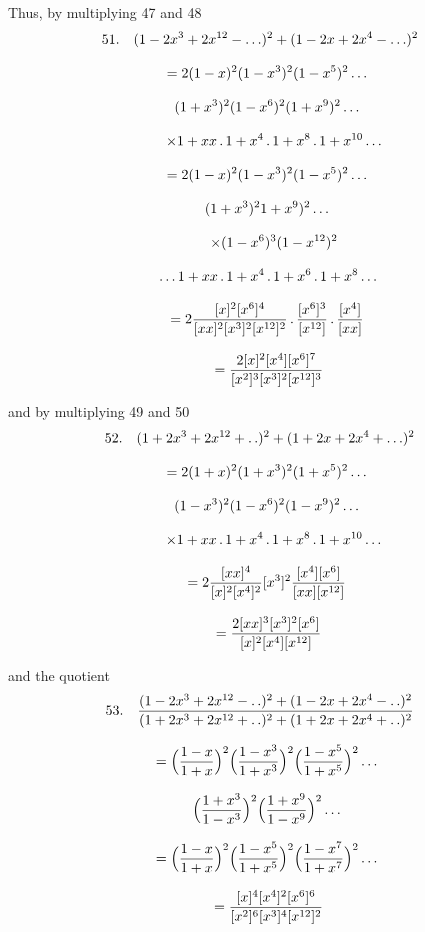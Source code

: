 Thus, by multiplying 47 and 48
\[
\begin{gathered}
51.\quad{}
(1-2x^3+2x^{12}-\mathinner{.\,.\,.})^2+(1-2x+2x^4-\mathinner{.\,.\,.})^2\\[8pt]
\quad=2(1-x)^2(1-x^3)^2(1-x^5)^2\mathinner{.\,.\,.}\\[8pt]\quad{}(1+x^3)^2(1-x^6)^2(1+x^9)^2\mathinner{.\,.\,.}\\[8pt]
\qquad\times1+xx\,.\,1+x^4\,.\,1+x^8\,.\,1+x^{10}\mathinner{.\,.\,.}\\[8pt]
\quad=2(1-x)^2(1-x^3)^2(1-x^5)^2\mathinner{.\,.\,.}\\[8pt]\quad{}(1+x^3)^2 1+x^9)^2\mathinner{.\,.\,.}\\[8pt]
\qquad\times(1-x^6)^3(1-x^{12})^2\\[8pt]\quad{}\mathinner{.\,.\,.} 1+xx\,.\,1+x^4\,.\,1+x^6\,.\,1+x^8\mathinner{.\,.\,.}\\[8pt]
\quad=2\frac{[x]^2[x^6]^4}{[xx]^2[x^3]^2[x^{12}]^2}\,.\,\frac{[x^6]^3}{[x^{12}]}\,.\,\frac{[x^4]}{[xx]}
\\[8pt]\quad{}=\frac{2[x]^2[x^4][x^6]^7}{[x^2]^3[x^3]^2[x^{12}]^3}
\end{gathered}
\]


and by multiplying 49 and 50
\[
\begin{gathered}
52.\quad{}
(1+2x^3+2x^{12}+ .\,. )^2+(1+2x+2x^4+\mathinner{.\,.\,.})^2\\[8pt]
\quad=2(1+x)^2(1+x^3)^2(1+x^5)^2\mathinner{.\,.\,.}\\[8pt]\quad{}(1-x^3)^2(1-x^6)^2(1-x^9)^2\mathinner{.\,.\,.}\\[8pt]
\qquad\times1+xx\,.\,1+x^4\,.\,1+x^8\,.\,1+x^{10}\mathinner{.\,.\,.}\\[8pt]
\quad=2\frac{[xx]^4}{[x]^2[x^4]^2}[x^3]^2\frac{[x^4][x^6]}{[xx][x^{12}]}
\\[8pt]\quad{}=\frac{2[xx]^3[x^3]^2[x^6]}{[x]^2[x^4][x^{12}]}
\end{gathered}
\]


and the quotient
\[
\begin{gathered}
53.\quad{}
\frac{(1-2x^3+2x^{12}- .\,. )^2+(1-2x+2x^4- .\,. )^2}
{(1+2x^3+2x^{12}+ .\,. )^2+(1+2x+2x^4+ .\,. )^2}\\[8pt]
\quad=\Bigl(\frac{1-x}{1+x}\Bigr)^2\Bigl(\frac{1-x^3}{1+x^3}\Bigr)^2\Bigl(\frac{1-x^5}{1+x^5}\Bigr)^2\mathinner{.\,.\,.}
\\[8pt]\quad{}\Bigl(\frac{1+x^3}{1-x^3}\Bigr)^2\Bigl(\frac{1+x^9}{1-x^9}\Bigr)^2\mathinner{.\,.\,.}\\[8pt]
\quad=\Bigl(\frac{1-x}{1+x}\Bigr)^2\Bigl(\frac{1-x^5}{1+x^5}\Bigr)^2\Bigl(\frac{1-x^7}{1+x^7}\Bigr)^2\mathinner{.\,.\,.}
\\[8pt]\quad{}=\frac{[x]^4[x^4]^2[x^6]^6}{[x^2]^6[x^3]^4[x^{12}]^2}
\end{gathered}
\]



